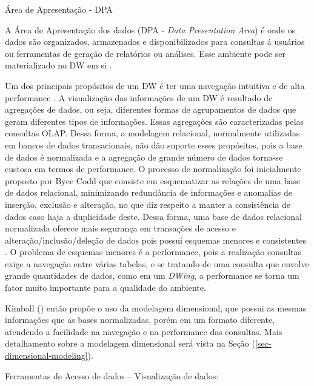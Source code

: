\begin{description}
\item[Área de Apresentação - DPA]
\end{description}
%

A Área de Apresentação dos dados (DPA - \emph{Data Presentation Area}) é onde os dados são organizados, armazenados e disponibilizados para consultas á usuários ou ferramentas de geração de relatórios ou análises. Esse ambiente pode ser materializado no DW em si \cite{kimball2002}. 


Um dos principais propósitos de um DW é ter uma navegação intuitiva e de alta performance \cite{kimball2002}. A visualização das informações de um DW é resultado de agregações de dados, ou seja, diferentes formas de agrupamentos de dados que geram diferentes tipos de informações. Essas agregações são caracterizadas pelas consultas OLAP. Dessa forma, a modelagem relacional, normalmente utilizadas em bancos de dados transacionais, não dão suporte esses propósitos, pois a base de dados é normalizada e a agregação de grande número de dados torna-se custosa em termos de performance. O processo de normalização foi inicialmente proposto por Byce Codd  que consiste em esquematizar as relações de uma base de dados relacional, minimizando redundância de informações e anomalias de inserção, exclusão e alteração, no que diz respeito a manter a consistência de dados caso haja a duplicidade deste. Dessa forma, uma base de dados relacional normalizada oferece mais segurança em transações de acesso e alteração/inclusão/deleção de dados pois possui esquemas menores e consistentes \cite{elmasri2006}. O problema de esquemas menores é a performance, pois a realização consultas exige a navegação  entre várias tabelas, e se tratando de uma consulta que envolve grande quantidades de dados, como em um \emph{DWing}, a performance se torna um fator muito importante para a qualidade do ambiente.

Kimball (\citeyear{kimball2002}) então propõe o uso da modelagem dimensional, que possui as mesmas informações que as bases normalizadas, porém em um formato diferente, atendendo a facilidade na navegação e na performance das consultas. Mais detalhamento sobre a modelagem dimensional será vista na Seção (\ref{sec-dimensional-modeling}).

\begin{description}
\item[Ferramentas de Acesso de dados – Visualização de dados:]
\end{description}

